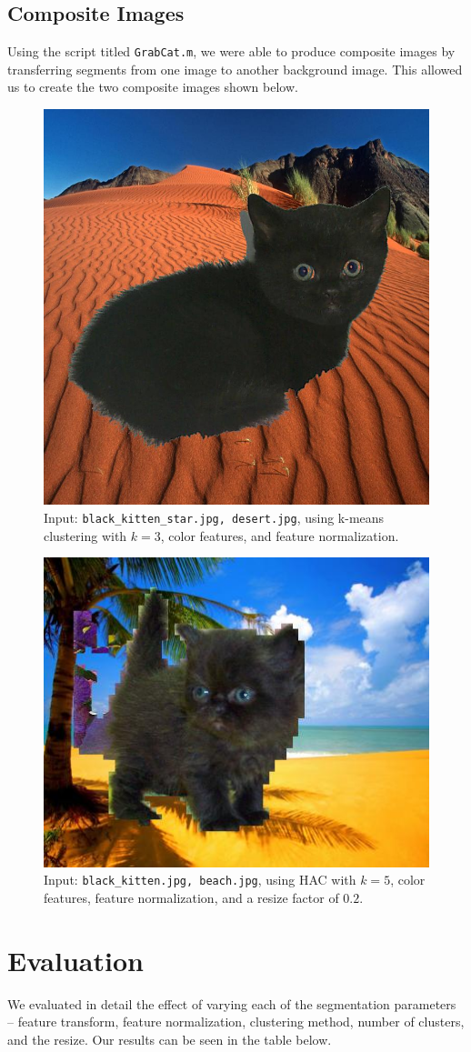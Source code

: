 \documentclass[12pt]{article}
\begin{document}
\subsection{Composite Images}
Using the script titled \texttt{GrabCat.m}, we were able to produce composite images by transferring segments from one image to another background image. This allowed us to create the two composite images shown below.

\begin{figure}[H]
	\centering
	\includegraphics[width=.4\textwidth]{grabcat1.jpg}
	\caption{Input: \texttt{black\_kitten\_star.jpg, desert.jpg}, using k-means clustering with $k = 3$, color features, and feature normalization.}
\end{figure}

\begin{figure}[H]
	\centering
	\includegraphics[width=.5\textwidth]{grabcat2.jpg}
	\caption{Input: \texttt{black\_kitten.jpg, beach.jpg}, using HAC with $k = 5$, color features, feature normalization, and a resize factor of $0.2$.}
\end{figure}

\section{Evaluation}
We evaluated in detail the effect of varying each of the segmentation parameters -- feature transform, feature normalization, clustering method, number of clusters, and the resize. Our results can be seen in the table below.
\end{document}
